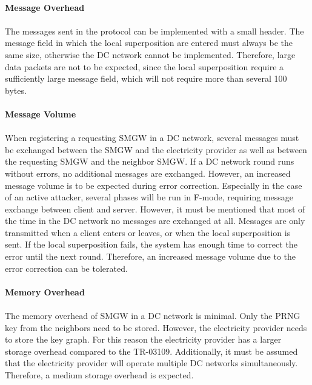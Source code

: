 \\
\textbf{Message Overhead}
\\
\\
The messages sent in the protocol can be implemented with a small header. The message field in which the local superposition are entered must always be the same size, otherwise the DC network cannot be implemented. Therefore, large data packets are not to be expected, since the local superposition require a sufficiently large message field, which will not require more than several 100 bytes. \\
\\
\textbf{Message Volume}
\\
\\
When registering a requesting \gls{SMGW} in a DC network, several messages must be exchanged between the \gls{SMGW} and the electricity provider as well as between the requesting \gls{SMGW} and the neighbor \gls{SMGW}. If a DC network round runs without errors, no additional messages are exchanged.
However, an increased message volume is to be expected during error correction. Especially in the case of an active attacker, several phases will be run in F-mode, requiring message exchange between client and server. However, it must be mentioned that most of the time in the DC network no messages are exchanged at all. Messages are only transmitted when a client enters or leaves, or when the local superposition is sent. If the local superposition fails, the system has enough time to correct the error until the next round. Therefore, an increased message volume due to the error correction can be tolerated.\\
\\
\textbf{Memory Overhead}
\\
\\
The memory overhead of \gls{SMGW} in a DC network is minimal. Only the \gls{PRNG} key from the neighbors need to be stored. However, the electricity provider needs to store the key graph. For this reason the electricity provider has a larger storage overhead compared to the \gls{TR-03109}. Additionally, it must be assumed that the electricity provider will operate multiple DC networks simultaneously. Therefore, a medium storage overhead is expected.

